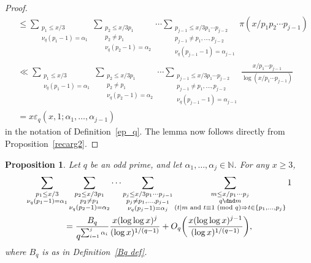 \documentclass[12pt,reqno]{amsart}
\newtheorem{proposition}[theorem]{Proposition}
\theoremstyle{definition}
\newcommand{\N}{{\mathbb N}}
\renewcommand{\mod}[1]{{\ifmmode\text{\rm\ (mod~$#1$)}\else\discretionary{}{}{\hbox{ }}\rm(mod~$#1$)\fi}}
\newcommand{\ep}{\varepsilon}
\begin{document}
\begin{proof}
\begin{align*}
&\le \sum_{\substack{p_1\le x/3\\\nu_q(p_1-1)=\alpha_1}}\sum_{\substack{p_2\le x/3p_1\\p_2\ne p_1\\\nu_q(p_2-1)=\alpha_2}}\cdots \sum_{\substack{p_{j-1}\le x/3p_1\cdots p_{j-2}\\p_{j-1}\ne p_1,\ldots,p_{j-2}\\\nu_q(p_{j-1}-1)=\alpha_{j-1}}} \pi(x/p_1p_2\cdots p_{j-1})\\
&\ll \sum_{\substack{p_1\le x/3\\\nu_q(p_1-1)=\alpha_1}}\sum_{\substack{p_2\le x/3p_1\\p_2\ne p_1\\\nu_q(p_2-1)=\alpha_2}}\cdots \sum_{\substack{p_{j-1}\le x/3p_1\cdots p_{j-2}\\p_{j-1}\ne p_1,\ldots,p_{j-2}\\\nu_q(p_{j-1}-1)=\alpha_{j-1}}}\frac{x/p_1\cdots p_{j-1}}{\log(x/p_1\cdots p_{j-1})} \\
&=x \ep_q(x,1;\alpha_1,\ldots,\alpha_{j-1})
\end{align*}
in the notation of Definition~\ref{ep_q}. The lemma now follows directly from Proposition~\ref{recarg2}.
\end{proof}

\begin{proposition}\label{firstsum}
Let $q$ be an odd prime, and let $\alpha_1,\dots,\alpha_j\in\N$. For any $x\ge3$,
\begin{multline} \label{J def}
\sum_{\substack{p_1\le x/3\\ \nu_q(p_1-1)=\alpha_1}}\sum_{\substack{p_2\le x/3p_1\\p_2\ne p_1\\\nu_q(p_2-1)=\alpha_2}}\cdots \sum_{\substack{p_j\le x/3p_1\cdots p_{j-1}\\p_j\ne p_1,\ldots,p_{j-1}\\\nu_q(p_j-1)=\alpha_j}}\sum_{\substack{m\le x/p_1\cdots p_j\\q\dnd m\\ (t\mid m\text{ and }t\equiv1\mod q \Rightarrow t\in\{p_1,\dots,p_j\}}}1\\
= \frac{B_q}{q^{\sum_{i=1}^j\alpha_i}} \frac{x(\log\log x)^j}{(\log x)^{1/(q-1)}}+O_q\bigg( \frac{x(\log\log x)^{j-1}}{(\log x)^{1/(q-1)}}\bigg),
\end{multline}
where $B_q$ is as in Definition~\ref{Bq def}.
\end{proposition}
\end{document}

